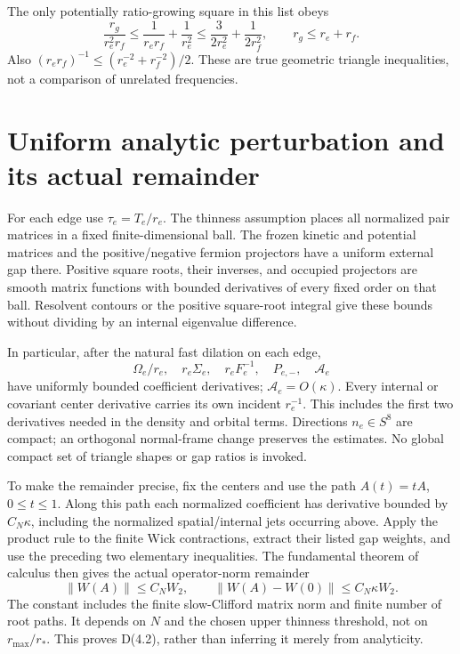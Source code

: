 \documentclass[11pt,letterpaper]{article}
\newcommand{\calA}{\mathcal A}
\begin{document}
The only potentially ratio-growing square in this list obeys
\[
 \frac{r_g}{r_e^2r_f}\le\frac1{r_er_f}+\frac1{r_e^2}
 \le\frac{3}{2r_e^2}+\frac1{2r_f^2},\qquad r_g\le r_e+r_f.
\]
Also $(r_er_f)^{-1}\le(r_e^{-2}+r_f^{-2})/2$. These are true geometric triangle inequalities, not a comparison of unrelated frequencies.

\section{Uniform analytic perturbation and its actual remainder}
For each edge use $\tau_e=T_e/r_e$. The thinness assumption places all normalized pair matrices in a fixed finite-dimensional ball. The frozen kinetic and potential matrices and the positive/negative fermion projectors have a uniform external gap there. Positive square roots, their inverses, and occupied projectors are smooth matrix functions with bounded derivatives of every fixed order on that ball. Resolvent contours or the positive square-root integral give these bounds without dividing by an internal eigenvalue difference.

In particular, after the natural fast dilation on each edge,
\[
 \Omega_e/r_e,\quad r_e\Sigma_e,\quad r_eF_e^{-1},\quad
 P_{e,-},\quad \calA_e
\]
have uniformly bounded coefficient derivatives; $\calA_e=O(\kappa)$. Every internal or covariant center derivative carries its own incident $r_e^{-1}$. This includes the first two derivatives needed in the density and orbital terms. Directions $n_e\in S^8$ are compact; an orthogonal normal-frame change preserves the estimates. No global compact set of triangle shapes or gap ratios is invoked.

To make the remainder precise, fix the centers and use the path $A(t)=tA$, $0\le t\le1$. Along this path each normalized coefficient has derivative bounded by $C_N\kappa$, including the normalized spatial/internal jets occurring above. Apply the product rule to the finite Wick contractions, extract their listed gap weights, and use the preceding two elementary inequalities. The fundamental theorem of calculus then gives the actual operator-norm remainder
\begin{equation}
 \|W(A)\|\le C_NW_2,\qquad
 \|W(A)-W(0)\|\le C_N\kappa W_2. \label{eq:Wpert}
\end{equation}
The constant includes the finite slow-Clifford matrix norm and finite number of root paths. It depends on $N$ and the chosen upper thinness threshold, not on $r_{\max}/r_*$. This proves D(4.2), rather than inferring it merely from analyticity.
\end{document}

